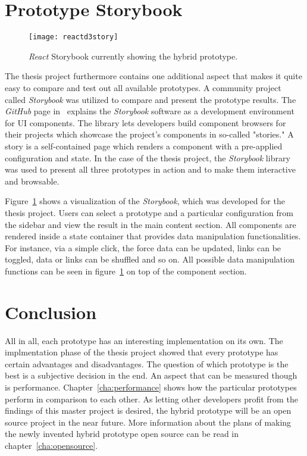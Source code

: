 \section{Prototype Storybook}

\begin{figure}
  \centering
  \texttt{[image: reactd3story]}
  \caption{\emph{React} Storybook currently showing the hybrid prototype.}
  \label{fig:reactD3stroy}
\end{figure}

The thesis project furthermore contains one additional aspect that makes it quite easy to compare and test out all available prototypes. A community project called \emph{Storybook} was utilized to compare and present the prototype results. The \emph{GitHub} page in~\cite{ReactStorybook} explains the \emph{Storybook} software as a development environment for UI components. The library lets developers build component browsers for their projects which showcase the project's components in so-called "stories." A story is a self-contained page which renders a component with a pre-applied configuration and state. In the case of the thesis project, the \emph{Storybook} library was used to present all three prototypes in action and to make them interactive and browsable.

Figure~\ref{fig:reactD3stroy} shows a visualization of the \emph{Storybook}, which was developed for the thesis project. Users can select a prototype and a particular configuration from the sidebar and view the result in the main content section. All components are rendered inside a state container that provides data manipulation functionalities. For instance, via a simple click, the force data can be updated, links can be toggled, data or links can be shuffled and so on. All possible data manipulation functions can be seen in figure~\ref{fig:reactD3stroy} on top of the component section.

\section{Conclusion}

All in all, each prototype has an interesting implementation on its own. The implmentation phase of the thesis project showed that every prototype has certain advantages and disadvantages. The question of which prototype is the best is a subjective decision in the end. An aspect that can be measured though is performance. Chapter~\ref{cha:performance} shows how the particular prototypes perform in comparison to each other. As letting other developers profit from the findings of this master project is desired, the hybrid prototype will be an open source project in the near future. More information about the plans of making the newly invented hybrid prototype open source can be read in chapter~\ref{cha:opensource}.